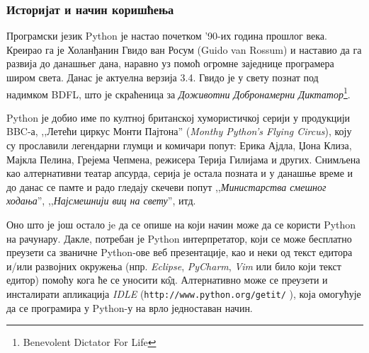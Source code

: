 \subsubsection{Историјат и начин коришћења}
Програмски језик Python је настао почетком '90-их година прошлог века. Креирао га је Холанђанин Гвидо ван Росум (Guido van Rossum) и наставио да га развија до данашњег дана, наравно уз помоћ огромне заједнице програмера широм света. Данас је актуелна верзија 3.4. Гвидо је у свету познат под надимком BDFL, што је скраћеница за \emph{Доживотни Добронамерни Диктатор}\footnote{Benevolent Dictator For Life}.

Python је добио име по култној британској хумористичкој серији у продукцији BBC-а, ,,Летећи циркус Монти Пајтона'' (\emph{Monthy Python's Flying Circus}), коју су прославили легендарни глумци и комичари попут: Ерика Ајдла, Џона Клиза, Мајкла Пелина, Грејема Чепмена, режисера Терија Гилијама и других. Снимљена као алтернативни театар апсурда, серија је остала позната и у данашње време и до данас се памте и радо гледају скечеви попут ,,\emph{Министарства смешног ходања}'', ,,\emph{Најсмешнији виц на свету}'', итд.

Оно што је још остало je да се опише на који начин може да се користи Python на рачунару. Дакле, потребан је Python интерпретатор, који се може бесплатно преузети са званичне Python-ове веб презентације\cite{pythonsite}, као и неки од текст едитора и/или развојних окружења (нпр. \emph{Eclipse}, \emph{PyCharm}, \emph{Vim} или било који текст едитор) помоћу кога ће се уносити к\^{о}д. Алтернативно може се преузети и инсталирати апликација \emph{IDLE} (\texttt{http://www.python.org/getit/} ), која омогућује да се програмира у Python-у на врло једноставан начин.

